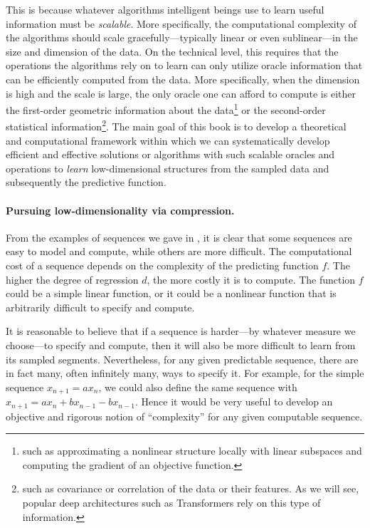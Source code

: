 \documentclass[../../book-main.tex]{subfiles}
\begin{document}
This is because whatever algorithms intelligent beings use to learn
useful information must be \textit{scalable}. More specifically, the
computational complexity of the algorithms should scale
gracefully---typically linear or even sublinear---in the size and
dimension of the data. On the technical level, this requires that the
operations the algorithms rely on to learn can only utilize oracle
information that can be efficiently computed from the data. More
specifically, when the dimension is high and the scale is large, the
only oracle one can afford to compute is either the first-order
geometric information about the data\footnote{such as approximating a
    nonlinear structure locally with linear subspaces and computing the
gradient of an objective function.} or the second-order statistical
information\footnote{such as covariance or correlation of the data or
    their features. As we will see, popular deep architectures such as
Transformers rely on this type of information.}.
The main goal of this book is to develop a theoretical and
computational framework within which we can systematically develop
efficient and effective solutions or algorithms with such scalable
oracles and operations to \textit{learn} low-dimensional structures
from the sampled data and subsequently the predictive function.

\paragraph{Pursuing low-dimensionality via compression.}
From the examples of sequences we gave in ,
it is clear that some sequences are easy to model and compute, while
others are more difficult. The computational cost of a sequence
depends on the complexity of the predicting function \(f\). The
higher the degree of regression \(d\), the more costly it is to
compute. The function \(f\) could be a simple linear function, or it
could be a nonlinear function that is arbitrarily difficult to
specify and compute.

It is reasonable to believe that if a sequence is harder---by
whatever measure we choose---to specify and compute, then it will
also be more difficult to learn from its sampled segments.
Nevertheless, for any given predictable sequence, there are in fact
many, often infinitely many, ways to specify it. For example, for the
simple sequence \(x_{n+1} = a x_{n}\), we could also define the same
sequence with \(x_{n+1} = a x_{n} + b x_{n-1} - b x_{n-1}\).
Hence it would be very useful to develop an objective and rigorous
notion of ``complexity'' for any given computable sequence.
\end{document}
